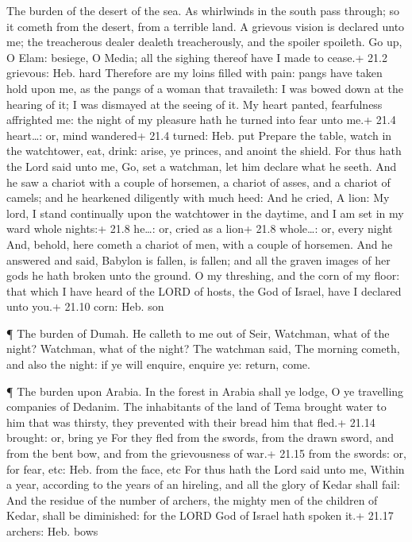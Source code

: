  The burden of the desert of the sea. As whirlwinds in the
south pass through; so it cometh from the desert, from a terrible land.
 A grievous vision is declared unto me; the treacherous
dealer dealeth treacherously, and the spoiler spoileth. Go up, O Elam:
besiege, O Media; all the sighing thereof have I made to cease.+ 21.2
grievous: Heb. hard  Therefore are my loins filled with
pain: pangs have taken hold upon me, as the pangs of a woman that
travaileth: I was bowed down at the hearing of it; I was dismayed at the
seeing of it.  My heart panted, fearfulness affrighted me:
the night of my pleasure hath he turned into fear unto me.+ 21.4
heart\ldots: or, mind wandered+ 21.4 turned: Heb. put 
Prepare the table, watch in the watchtower, eat, drink: arise, ye
princes, and anoint the shield.  For thus hath the Lord said
unto me, Go, set a watchman, let him declare what he seeth. 
And he saw a chariot with a couple of horsemen, a chariot of asses, and
a chariot of camels; and he hearkened diligently with much heed:
 And he cried, A lion: My lord, I stand continually upon the
watchtower in the daytime, and I am set in my ward whole nights:+ 21.8
he\ldots: or, cried as a lion+ 21.8 whole\ldots: or, every night
 And, behold, here cometh a chariot of men, with a couple of
horsemen. And he answered and said, Babylon is fallen, is fallen; and
all the graven images of her gods he hath broken unto the ground.
 O my threshing, and the corn of my floor: that which I
have heard of the LORD of hosts, the God of Israel, have I declared unto
you.+ 21.10 corn: Heb. son

 ¶ The burden of Dumah. He calleth to me out of Seir,
Watchman, what of the night? Watchman, what of the night? 
The watchman said, The morning cometh, and also the night: if ye will
enquire, enquire ye: return, come.

 ¶ The burden upon Arabia. In the forest in Arabia shall ye
lodge, O ye travelling companies of Dedanim.  The
inhabitants of the land of Tema brought water to him that was thirsty,
they prevented with their bread him that fled.+ 21.14 brought: or, bring
ye  For they fled from the swords, from the drawn sword,
and from the bent bow, and from the grievousness of war.+ 21.15 from the
swords: or, for fear, etc: Heb. from the face, etc  For
thus hath the Lord said unto me, Within a year, according to the years
of an hireling, and all the glory of Kedar shall fail:  And
the residue of the number of archers, the mighty men of the children of
Kedar, shall be diminished: for the LORD God of Israel hath spoken it.+
21.17 archers: Heb. bows

